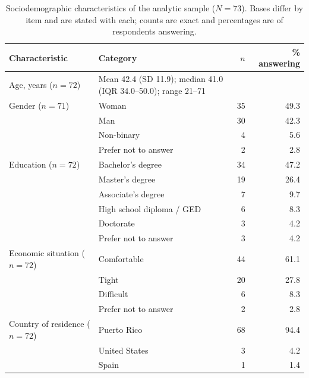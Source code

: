 \documentclass[12pt]{article}
\begin{document}
\clearpage
\begin{table}[htbp]
\centering
\caption{Sociodemographic characteristics of the analytic sample ($N=73$). Bases differ by item and are
stated with each; counts are exact and percentages are of respondents answering.}
\label{tab:demo}
\begin{tabular}{p{3.6cm}p{6.4cm}rr}
\toprule
Characteristic & Category & $n$ & \% answering \\
\midrule
Age, years ($n=72$) & Mean 42.4 (SD 11.9); median 41.0 (IQR 34.0--50.0); range 21--71 & & \\
\addlinespace
Gender ($n=71$)     & Woman & 35 & 49.3 \\
                    & Man & 30 & 42.3 \\
                    & Non-binary & 4 & 5.6 \\
                    & Prefer not to answer & 2 & 2.8 \\
\addlinespace
Education ($n=72$)  & Bachelor's degree & 34 & 47.2 \\
                    & Master's degree & 19 & 26.4 \\
                    & Associate's degree & 7 & 9.7 \\
                    & High school diploma / GED & 6 & 8.3 \\
                    & Doctorate & 3 & 4.2 \\
                    & Prefer not to answer & 3 & 4.2 \\
\addlinespace
Economic situation ($n=72$) & Comfortable & 44 & 61.1 \\
                    & Tight & 20 & 27.8 \\
                    & Difficult & 6 & 8.3 \\
                    & Prefer not to answer & 2 & 2.8 \\
\addlinespace
Country of residence ($n=72$) & Puerto Rico & 68 & 94.4 \\
                    & United States & 3 & 4.2 \\
                    & Spain & 1 & 1.4 \\
\bottomrule
\end{tabular}
\end{table}
\end{document}
